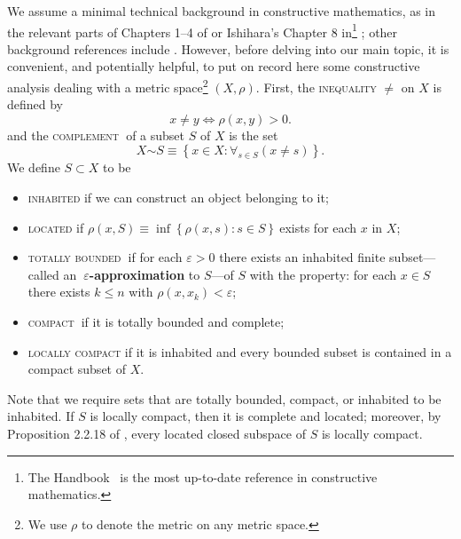 \documentclass[11pt]{article}%
\begin{document}
We assume a minimal technical background in constructive mathematics, as in
the relevant parts of Chapters 1--4 of \cite{bv} or Ishihara's Chapter 8
in\footnote{%
\normalfont\sf
The Handbook \cite{Handbook}\ is the most up-to-date reference in constructive
mathematics.} \cite{Handbook}; other background references include
\cite{Bish,BB,BR,TvD}. However, before delving into our main topic, it is
convenient, and potentially helpful, to put on record here some constructive
analysis dealing with a metric space\footnote{%
\normalfont\sf
We use $\rho$ to denote the metric on any metric space.} $(X,\rho)$. First,
the \textsc{inequality} $\neq$ on $X$ is defined by%
\[
x\neq y\Leftrightarrow\rho(x,y)>0.
\]
and the \textsc{complement}\textbf{\ }of a subset $S$ of $X$ is the set%
\[
X%
\mathord{\sim}%
S\equiv\left\{  x\in X:\forall_{s\in S}\left(  x\neq s\right)  \right\}  .
\]
We define $S\subset X$ to be

\begin{itemize}
\item[$\blacktriangleright$] \textsc{inhabited} if we can construct an object
belonging to it;

\item[$\blacktriangleright$] \textsc{located} if $\rho(x,S)\equiv\inf\left\{
\rho(x,s):s\in S\right\}  \ $exists for each $x$ in $X$;

\item[$\blacktriangleright$] \textsc{totally bounded}\textbf{\ }if for each
$\varepsilon>0$ there exists an inhabited finite subset---called
an\textbf{\ }$\varepsilon$\textbf{-approximation }to $S$---of $S$ with the
property: for each $x\in S$ there exists $k\leqslant n$ with $\rho
(x,x_{k})<\varepsilon$;

\item[$\blacktriangleright$] \textsc{compact}\textbf{\ }if it is totally
bounded and complete;

\item[$\blacktriangleright$] \textsc{locally compact} if it is inhabited and
every bounded subset is contained in a compact subset of $X$.
\end{itemize}

%

\noindent
Note that we require sets that are totally bounded, compact, or inhabited to
be inhabited. If $S$ is locally compact, then it is complete and located;
moreover, by Proposition 2.2.18 of \cite{bv}, every located closed subspace of
$S$ is locally compact.
\end{document}
